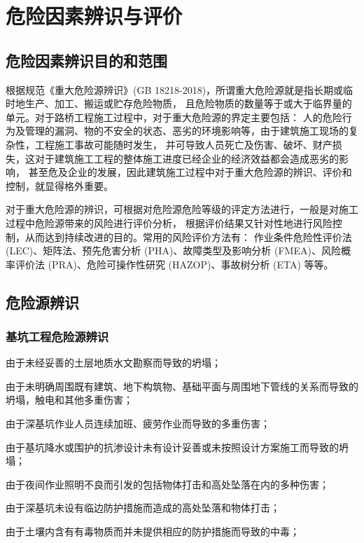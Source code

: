 \section{危险因素辨识与评价}

\subsection{危险因素辨识目的和范围}

根据规范《重大危险源辨识》(GB 18218-2018)，所谓重大危险源就是指长期或临时地生产、加工、搬运或贮存危险物质，
且危险物质的数量等于或大于临界量的单元。对于路桥工程施工过程中，对于重大危险源的界定主要包括：
人的危险行为及管理的漏洞、物的不安全的状态、恶劣的环境影响等，由于建筑施工现场的复杂性，工程施工事故可能随时发生，
并可导致人员死亡及伤害、破坏、财产损失，这对于建筑施工工程的整体施工进度已经企业的经济效益都会造成恶劣的影响，
甚至危及企业的发展，因此建筑施工过程中对于重大危险源的辨识、评价和控制，就显得格外重要。

对于重大危险源的辨识，可根据对危险源危险等级的评定方法进行，一般是对施工过程中危险源带来的风险进行评价分析，
根据评价结果又针对性地进行风险控制，从而达到持续改进的目的。常用的风险评价方法有：
作业条件危险性评价法(LEC)、矩阵法、预先危害分析 (PHA)、故障类型及影响分析 (FMEA)、风险概率评价法 (PRA)、危险可操作性研究 (HAZOP)、事故树分析 (ETA) 等等。

\subsection{危险源辨识}
\subsubsection{基坑工程危险源辨识}

 由于未经妥善的土层地质水文勘察而导致的坍塌；

 由于未明确周围既有建筑、地下构筑物、基础平面与周围地下管线的关系而导致的坍塌，触电和其他多重伤害；

 由于深基坑作业人员连续加班、疲劳作业而导致的多重伤害；

 由于基坑降水或围护的抗渗设计未有设计妥善或未按照设计方案施工而导致的坍塌；

 由于夜间作业照明不良而引发的包括物体打击和高处坠落在内的多种伤害；

 由于深基坑未设有临边防护措施而造成的高处坠落和物体打击；

 由于土壤内含有有毒物质而并未提供相应的防护措施而导致的中毒；


